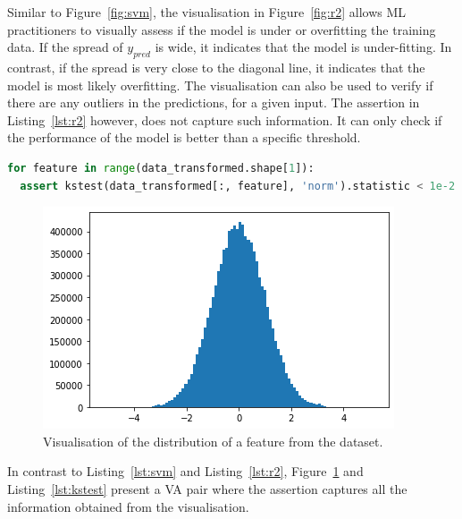 \documentclass[conference]{IEEEtran}
\begin{document}
Similar to Figure~\ref{fig:svm}, the visualisation in Figure~\ref{fig:r2} allows ML practitioners to visually assess if the model is under or overfitting the training data. If the spread of $y_{pred}$ is wide, it indicates that the model is under-fitting. In contrast, if the spread is very close to the diagonal line, it indicates that the model is most likely overfitting. The visualisation can also be used to verify if there are any outliers in the predictions, for a given input. The assertion in Listing~\ref{lst:r2} however, does not capture such information. It can only check if the performance of the model is better than a specific threshold.

\begin{lstlisting}[language=Python, caption={Assertion to check that each feature in a dataset is normal. The distribution of each feature is compared to that of a normal distribution using the Kolmogorov-Smirnov test for goodness of fit from the scipy library.}, label={lst:kstest}]
for feature in range(data_transformed.shape[1]):
  assert kstest(data_transformed[:, feature], 'norm').statistic < 1e-2
\end{lstlisting}

\begin{figure}
  \includegraphics[width=\linewidth]{../catalogue/select-152a.png}
  \caption{Visualisation of the distribution of a feature from the dataset.}\label{fig:kstest}
\end{figure}

In contrast to Listing~\ref{lst:svm} and Listing~\ref{lst:r2}, Figure~\ref{fig:kstest} and Listing~\ref{lst:kstest} present a VA pair where the assertion captures all the information obtained from the visualisation.
\end{document}
